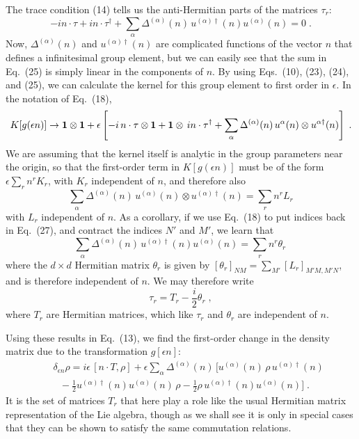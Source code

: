 The trace condition (14) tells us the anti-Hermitian parts of the matrices $\tau_r$:
\begin{equation}
-in\cdot \tau  +i n\cdot\tau^\dagger+\sum_\alpha \Delta^{(\alpha)}(n)\,u^{(\alpha)\dagger}(n) u^{(\alpha)}(n)=0\;.
\end{equation}
Now, $\Delta^{(\alpha)}(n)$ and  $u^{(\alpha)\dagger}(n)$ are complicated functions of the vector $n$ that defines a infinitesimal group element, but we can easily see that the sum in Eq.~(25) is simply linear in the components of $n$.   By using Eqs.~(10), (23), (24), and (25), we can calculate the kernel for this group element to first order in $\epsilon $. In the notation of Eq.~(18),
\begin{equation}
K[g(\epsilon n)]\rightarrow {\mbox{\boldmath{$1$}}}\otimes {\mbox{\boldmath{$1$}}}+\epsilon\left[-i\, n\cdot \tau\otimes \mbox{\boldmath{$1$}}+\mbox{\boldmath{$1$}}\otimes \,in\cdot\tau^\dagger
+\sum_\alpha \Delta^{(\alpha)}(n)\,u^{\alpha}(n)\otimes u^{\alpha\dagger}(n)\right]\;.
\end{equation}
We are assuming that the kernel itself is analytic in the group parameters near the origin, so that 
the first-order term in $K[g(\epsilon n)]$ must be of the form $\epsilon 
\sum_r n^r K_r$, with $K_r$ independent of $n$, and therefore also
\begin{equation}
\sum_\alpha \Delta^{(\alpha)}(n)\,u^{(\alpha)}(n)\otimes u^{(\alpha)\dagger}(n)=\sum_r n^r L_r
\end{equation}
with $L_r$ independent of $n$.  As a corollary, if we use Eq.~(18) to put indices back in Eq.~(27), and contract the indices $N'$ and $M'$, we learn that 
\begin{equation}
\sum_\alpha \Delta^{(\alpha)}(n)\,u^{(\alpha)\dagger}(n) u^{(\alpha)}(n)=\sum_r n^r \theta_r\,
\end{equation}
where the  $d\times d$ Hermitian matrix $\theta_r$ is given by $[\theta_r]_{NM}=\sum_{M'}[L_r]_{M'M,M'N}$, and is therefore independent of $n$.
We may therefore write
\begin{equation}
\tau_r=T_r-\frac{i}{2}\theta_r\;,
\end{equation}
where $T_r$ are  Hermitian matrices, which like $\tau_r$ and $\theta_r$ are independent of $n$.  

Using these results in Eq.~(13), we find the first-order change in the density matrix due to the transformation $g[\epsilon n]$:
\begin{eqnarray}
&&\delta_{\epsilon n} \rho=i\epsilon\,[n\cdot T,\rho]+\epsilon\sum_\alpha  \Delta^{(\alpha)}(n)\,\Bigg[u^{(\alpha)}(n)\,\rho\, u^{(\alpha)\dagger}(n)\nonumber\\&&~~~
-\frac{1}{2}u^{(\alpha)\dagger}(n)u^{(\alpha)}(n)\,\rho
-\frac{1}{2}\rho\, u^{(\alpha)\dagger}(n)u^{(\alpha)}(n)\Bigg]\;.
\end{eqnarray}
It is the set of matrices $T_r$ that here play a role like the usual Hermitian  matrix representation of the Lie algebra, though as we shall see it is only in special cases that they can be shown to satisfy the same commutation relations.

